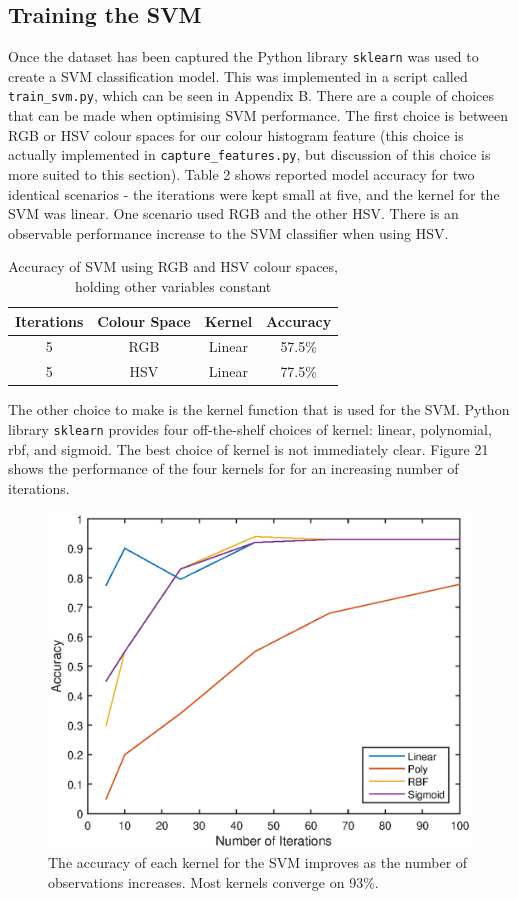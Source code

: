 \documentclass[a4paper]{article}
\begin{document}
\subsection{Training the SVM}
Once the dataset has been captured the Python library \verb|sklearn| was used to create a SVM classification model. This was implemented in a script called \verb|train_svm.py|, which can be seen in Appendix B. There are a couple of choices that can be made when optimising SVM performance. The first choice is between RGB or HSV colour spaces for our colour histogram feature (this choice is actually implemented in \verb|capture_features.py|, but discussion of this choice is more suited to this section). Table 2 shows reported model accuracy for two identical scenarios - the iterations were kept small at five, and the kernel for the SVM was linear. One scenario used RGB and the other HSV. There is an observable performance increase to the SVM classifier when using HSV.
\begin{table}[h]
	\centering
	\caption{Accuracy of SVM using RGB and HSV colour spaces, holding other variables constant}
	\begin{tabular}{cccc}
		\toprule
		\textbf{Iterations} & \textbf{Colour Space} & \textbf{Kernel} & \textbf{Accuracy}\\
		\midrule
		5 & RGB & Linear & 57.5\%\\
		5 & HSV & Linear & 77.5\%\\
		\bottomrule
	\end{tabular}
\end{table}

The other choice to make is the kernel function that is used for the SVM. Python library \verb|sklearn| provides four off-the-shelf choices of kernel: linear, polynomial, rbf, and sigmoid. The best choice of kernel is not immediately clear. Figure 21 shows the performance of the four kernels for for an increasing number of iterations.  
\begin{figure}[h]
	\centering
	\includegraphics[scale=0.6]{kernels}
	\caption{The accuracy of each kernel for the SVM improves as the number of observations increases. Most kernels converge on 93\%.}
\end{figure}
\end{document}

